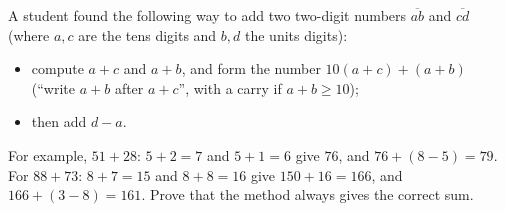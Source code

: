 A student found the following way to add two two-digit numbers $\overline{ab}$ and $\overline{cd}$ (where $a,c$ are the tens digits and $b,d$ the units digits):
\begin{itemize}
\item compute $a+c$ and $a+b$, and form the number $10(a+c)+(a+b)$ (``write $a+b$ after $a+c$'', with a carry if $a+b\ge10$);
\item then add $d-a$.
\end{itemize}
For example, $51+28$: $5+2=7$ and $5+1=6$ give $76$, and $76+(8-5)=79$. For $88+73$: $8+7=15$ and $8+8=16$ give $150+16=166$, and $166+(3-8)=161$. Prove that the method always gives the correct sum.
